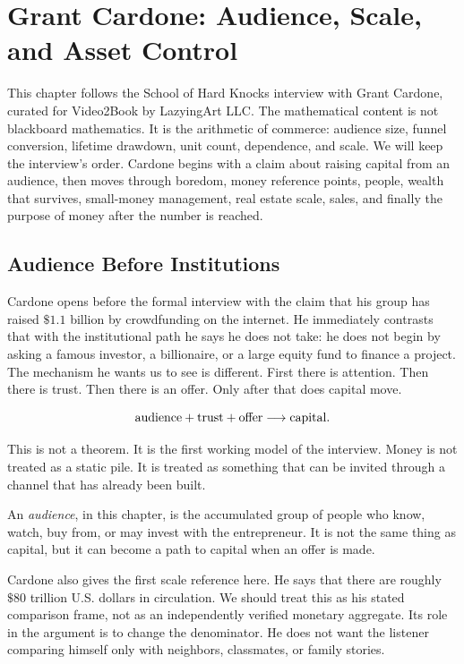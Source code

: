 \chapter{Grant Cardone: Audience, Scale, and Asset Control}

This chapter follows the School of Hard Knocks interview with Grant Cardone, curated for Video2Book by LazyingArt LLC. The mathematical content is not blackboard mathematics. It is the arithmetic of commerce: audience size, funnel conversion, lifetime drawdown, unit count, dependence, and scale. We will keep the interview's order. Cardone begins with a claim about raising capital from an audience, then moves through boredom, money reference points, people, wealth that survives, small-money management, real estate scale, sales, and finally the purpose of money after the number is reached.

\section{Audience Before Institutions}

Cardone opens before the formal interview with the claim that his group has raised \(\$1.1\) billion by crowdfunding on the internet. He immediately contrasts that with the institutional path he says he does not take: he does not begin by asking a famous investor, a billionaire, or a large equity fund to finance a project. The mechanism he wants us to see is different. First there is attention. Then there is trust. Then there is an offer. Only after that does capital move.

\[
\hbox{audience}+\hbox{trust}+\hbox{offer}
\longrightarrow
\hbox{capital}.
\]

This is not a theorem. It is the first working model of the interview. Money is not treated as a static pile. It is treated as something that can be invited through a channel that has already been built.

\begin{definition}
An \emph{audience}, in this chapter, is the accumulated group of people who know, watch, buy from, or may invest with the entrepreneur. It is not the same thing as capital, but it can become a path to capital when an offer is made.
\end{definition}

Cardone also gives the first scale reference here. He says that there are roughly \(\$80\) trillion U.S. dollars in circulation. We should treat this as his stated comparison frame, not as an independently verified monetary aggregate. Its role in the argument is to change the denominator. He does not want the listener comparing himself only with neighbors, classmates, or family stories.

